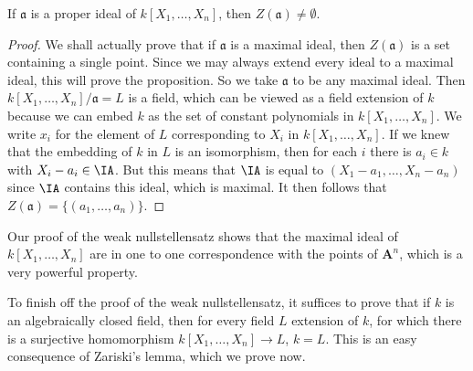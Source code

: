 \begin{lemma}
    If $\mathfrak{a}$ is a proper ideal of $k[X_1, \dots, X_n]$, then $Z(\mathfrak{a}) \neq \emptyset$.
\end{lemma}
\begin{proof}
    We shall actually prove that if $\mathfrak{a}$ is a maximal ideal, then $Z(\mathfrak{a})$ is a set containing a single point. Since we may always extend every ideal to a maximal ideal, this will prove the proposition. So we take $\mathfrak{a}$ to be any maximal ideal. Then $k[X_1, \dots, X_n]/\mathfrak{a} = L$ is a field, which can be viewed as a field extension of $k$ because we can embed $k$ as the set of constant polynomials in $k[X_1, \dots, X_n]$. We write $x_i$ for the element of $L$ corresponding to $X_i$ in $k[X_1,\dots,X_n]$. If we knew that the embedding of $k$ in $L$ is an isomorphism, then for each $i$ there is $a_i \in k$ with $X_i - a_i \in \IA$. But this means that $\IA$ is equal to $(X_1 - a_1, \dots, X_n - a_n)$ since $\IA$ contains this ideal, which is maximal. It then follows that $Z(\mathfrak{a}) = \{ (a_1, \dots, a_n) \}$.
\end{proof}

\begin{remark}
    Our proof of the weak nullstellensatz shows that the maximal ideal of $k[X_1,\dots,X_n]$ are in one to one correspondence with the points of $\mathbf{A}^n$, which is a very powerful property.
\end{remark}


To finish off the proof of the weak nullstellensatz, it suffices to prove that if $k$ is an algebraically closed field, then for every field $L$ extension of $k$, for which there is a surjective homomorphism $k[X_1,\dots,X_n] \to L$, $k = L$. This is an easy consequence of Zariski's lemma, which we prove now.

